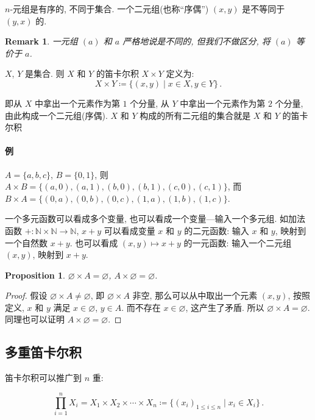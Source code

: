 \documentclass[UTF8]{ctexart}
\theoremstyle{mystyle}
\newtheorem{proposition}{Proposition}[section]
\theoremstyle{myremark}
\newtheorem*{remark}{Remark}
\theoremstyle{plain}
\newcommand{\N}{\mathbb N}
\newcommand{\set}[1]{\{#1\}}
\begin{document}
$ n $-元组是有序的, 不同于集合. 一个二元组(也称``序偶'') $ (x, y) $ 是不等同于 $ (y, x) $ 的.

\begin{remark}
    一元组 $ (a) $ 和 $ a $ 严格地说是不同的, 但我们不做区分, 将 $ (a) $ 等价于 $ a $.
\end{remark}

\begin{definition}
    $ X $, $ Y $ 是集合. 则 $ X $ 和 $ Y $ 的笛卡尔积 $ X \times Y $ 定义为: \[ X \times Y \coloneqq \set{(x, y) \mid x \in X, y \in Y} \,.\]
\end{definition}

即从 $ X $ 中拿出一个元素作为第 $ 1 $ 个分量, 从 $ Y $ 中拿出一个元素作为第 $ 2 $ 个分量, 由此构成一个二元组(序偶). $ X $ 和 $ Y $ 构成的所有二元组的集合就是 $ X $ 和 $ Y $ 的笛卡尔积

\paragraph{例}
$ A = \set{a, b, c} $, $ B = \set{0, 1} $, 则 $ A \times B = \set{(a, 0), (a, 1), (b, 0), (b, 1), (c, 0), (c, 1)} $, 而 $ B \times A = \set{(0, a), (0, b), (0, c), (1, a), (1, b), (1, c)} $.

一个多元函数可以看成多个变量, 也可以看成一个变量---输入一个多元组. 如加法函数 $ + \colon \N \times \N \to \N $, $ x + y $ 可以看成变量 $ x $ 和 $ y $ 的二元函数: 输入 $ x $ 和 $ y $, 映射到一个自然数 $ x + y $. 也可以看成 $ (x, y) \mapsto x + y $ 的一元函数: 输入一个二元组 $ (x, y) $, 映射到 $ x + y $.

\begin{proposition}
    $ \varnothing \times A = \varnothing $, $ A \times \varnothing = \varnothing $.
\end{proposition}

\begin{proof}
    假设 $ \varnothing \times A \neq \varnothing $, 即 $ \varnothing \times A $ 非空, 那么可以从中取出一个元素 $ (x, y) $, 按照定义, $ x $ 和 $ y $ 满足 $ x \in \varnothing $, $ y \in A $. 而不存在 $ x \in \varnothing $, 这产生了矛盾. 所以 $ \varnothing \times A = \varnothing $. 同理也可以证明 $ A \times \varnothing = \varnothing $.
\end{proof}


\subsection{多重笛卡尔积}
笛卡尔积可以推广到 $ n $ 重:
\begin{definition}
    \[ \prod_{i = 1}^n X_i = X_1 \times X_2 \times \cdots \times X_n \coloneqq \set{(x_i)_{1 \leqslant i \leqslant n} \mid x_i \in X_i } \,.\]
\end{definition}
\end{document}
